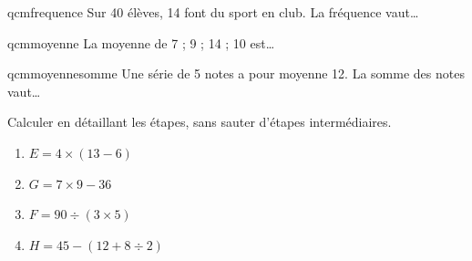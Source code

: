 \documentclass[a4paper, 10pt]{article}
\begin{document}
{\begin{exercicebox}[\it{QCM}]
\begin{minipage}{0.48\textwidth}
        \begin{question}{qcmfrequence}  
            Sur 40 élèves, 14 font du sport en club. La fréquence vaut…
            \begin{reponseshoriz}
            \end{reponseshoriz}
        \end{question}


        \begin{question}{qcmmoyenne}  
            La moyenne de 7 ; 9 ; 14 ; 10 est…
            \begin{reponseshoriz}
            \end{reponseshoriz}
        \end{question}

        \begin{question}{qcmmoyennesomme}  
            Une série de 5 notes a pour moyenne 12. La somme des notes vaut…
            \begin{reponseshoriz}
            \end{reponseshoriz}
        \end{question}

    \end{minipage}


\end{exercicebox}
\begin{exercicebox}[
        \AMCOpen{
            contentcommand=nodata,
            answer=\usebox{\thbox}
        }{\mauvaise{0}\bareme{0}\mauvaise{1}\bareme{1}\bonne[2]{2}\bareme{2}}]
      Calculer en détaillant les étapes, sans sauter d'étapes intermédiaires.
    \begin{enumerate}
        \item $E=4×(13−6)$
        \item $G=7×9−36$
        \item $F=90÷(3×5)$
        \item $H=45−(12+8÷2)$
    \end{enumerate}
\end{exercicebox}

}
\end{document}
